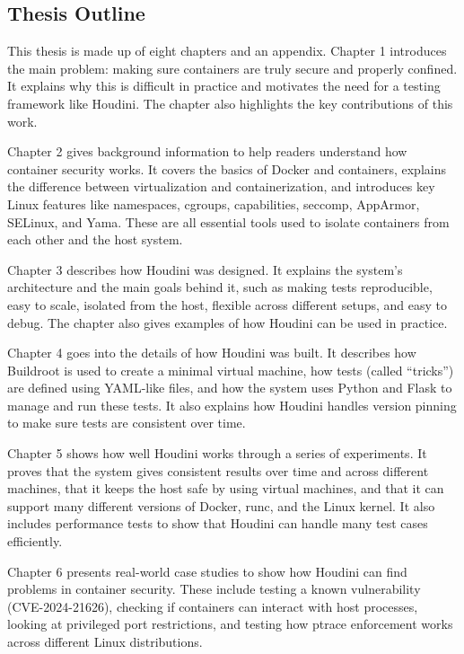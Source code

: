 \begin{doublespace}
\section{Thesis Outline}

This thesis is made up of eight chapters and an appendix. Chapter 1 introduces the main problem: making sure containers are truly secure and properly confined. It explains why this is difficult in practice and motivates the need for a testing framework like Houdini. The chapter also highlights the key contributions of this work.

Chapter 2 gives background information to help readers understand how container security works. It covers the basics of Docker and containers, explains the difference between virtualization and containerization, and introduces key Linux features like namespaces, cgroups, capabilities, seccomp, AppArmor, SELinux, and \gls{Yama}. These are all essential tools used to isolate containers from each other and the host system.

Chapter 3 describes how Houdini was designed. It explains the system’s architecture and the main goals behind it, such as making tests reproducible, easy to scale, isolated from the host, flexible across different setups, and easy to debug. The chapter also gives examples of how Houdini can be used in practice.

Chapter 4 goes into the details of how Houdini was built. It describes how Buildroot is used to create a minimal virtual machine, how tests (called “tricks”) are defined using YAML-like files, and how the system uses Python and Flask to manage and run these tests. It also explains how Houdini handles \gls{version pinning} to make sure tests are consistent over time.

Chapter 5 shows how well Houdini works through a series of experiments. It proves that the system gives consistent results over time and across different machines, that it keeps the host safe by using virtual machines, and that it can support many different versions of Docker, runc, and the Linux kernel. It also includes performance tests to show that Houdini can handle many test cases efficiently.

Chapter 6 presents real-world case studies to show how Houdini can find problems in container security. These include testing a known vulnerability (CVE-2024-21626), checking if containers can interact with host processes, looking at privileged port restrictions, and testing how \gls{ptrace} enforcement works across different Linux distributions.


\end{doublespace}
